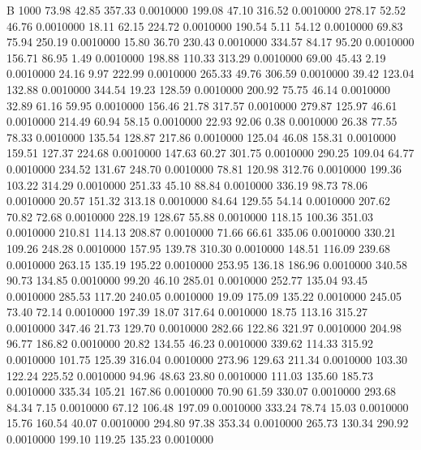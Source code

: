 


B 1000
  73.98   42.85  357.33   0.0010000
 199.08   47.10  316.52   0.0010000
 278.17   52.52   46.76   0.0010000
  18.11   62.15  224.72   0.0010000
 190.54    5.11   54.12   0.0010000
  69.83   75.94  250.19   0.0010000
  15.80   36.70  230.43   0.0010000
 334.57   84.17   95.20   0.0010000
 156.71   86.95    1.49   0.0010000
 198.88  110.33  313.29   0.0010000
  69.00   45.43    2.19   0.0010000
  24.16    9.97  222.99   0.0010000
 265.33   49.76  306.59   0.0010000
  39.42  123.04  132.88   0.0010000
 344.54   19.23  128.59   0.0010000
 200.92   75.75   46.14   0.0010000
  32.89   61.16   59.95   0.0010000
 156.46   21.78  317.57   0.0010000
 279.87  125.97   46.61   0.0010000
 214.49   60.94   58.15   0.0010000
  22.93   92.06    0.38   0.0010000
  26.38   77.55   78.33   0.0010000
 135.54  128.87  217.86   0.0010000
 125.04   46.08  158.31   0.0010000
 159.51  127.37  224.68   0.0010000
 147.63   60.27  301.75   0.0010000
 290.25  109.04   64.77   0.0010000
 234.52  131.67  248.70   0.0010000
  78.81  120.98  312.76   0.0010000
 199.36  103.22  314.29   0.0010000
 251.33   45.10   88.84   0.0010000
 336.19   98.73   78.06   0.0010000
  20.57  151.32  313.18   0.0010000
  84.64  129.55   54.14   0.0010000
 207.62   70.82   72.68   0.0010000
 228.19  128.67   55.88   0.0010000
 118.15  100.36  351.03   0.0010000
 210.81  114.13  208.87   0.0010000
  71.66   66.61  335.06   0.0010000
 330.21  109.26  248.28   0.0010000
 157.95  139.78  310.30   0.0010000
 148.51  116.09  239.68   0.0010000
 263.15  135.19  195.22   0.0010000
 253.95  136.18  186.96   0.0010000
 340.58   90.73  134.85   0.0010000
  99.20   46.10  285.01   0.0010000
 252.77  135.04   93.45   0.0010000
 285.53  117.20  240.05   0.0010000
  19.09  175.09  135.22   0.0010000
 245.05   73.40   72.14   0.0010000
 197.39   18.07  317.64   0.0010000
  18.75  113.16  315.27   0.0010000
 347.46   21.73  129.70   0.0010000
 282.66  122.86  321.97   0.0010000
 204.98   96.77  186.82   0.0010000
  20.82  134.55   46.23   0.0010000
 339.62  114.33  315.92   0.0010000
 101.75  125.39  316.04   0.0010000
 273.96  129.63  211.34   0.0010000
 103.30  122.24  225.52   0.0010000
  94.96   48.63   23.80   0.0010000
 111.03  135.60  185.73   0.0010000
 335.34  105.21  167.86   0.0010000
  70.90   61.59  330.07   0.0010000
 293.68   84.34    7.15   0.0010000
  67.12  106.48  197.09   0.0010000
 333.24   78.74   15.03   0.0010000
  15.76  160.54   40.07   0.0010000
 294.80   97.38  353.34   0.0010000
 265.73  130.34  290.92   0.0010000
 199.10  119.25  135.23   0.0010000
